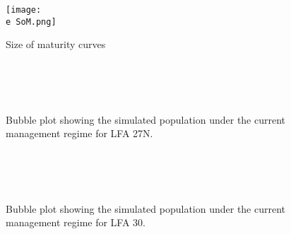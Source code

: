 \documentclass[11pt]{article}
\newcommand{\e}{\string~/bio.data/bio.lobster/figures/LFA2733Framework2018/} %
\begin{document}
  
    \begin{figure}
    \centering
        \texttt{[image: \\e SoM.png]}
        \caption{Size of maturity curves}

    \end{figure}    

  



    

    \begin{figure}
    \centering
                \\
                \\
                \\
        
         \caption{Bubble plot showing the simulated population under the current management regime for LFA 27N.}
    \end{figure}
    
    \begin{figure}
    \centering
                \\
                \\
                \\
        
         \caption{Bubble plot showing the simulated population under the current management regime for LFA 30.}
    \end{figure}
    
\end{document}
